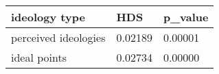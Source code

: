 \begin{table}
\centering
\begin{tabular}[t]{lll}
\toprule
ideology type & HDS & p\_value\\
\midrule
perceived ideologies & 0.02189 & 0.00001\\
ideal points & 0.02734 & 0.00000\\
\bottomrule
\end{tabular}
\end{table}
